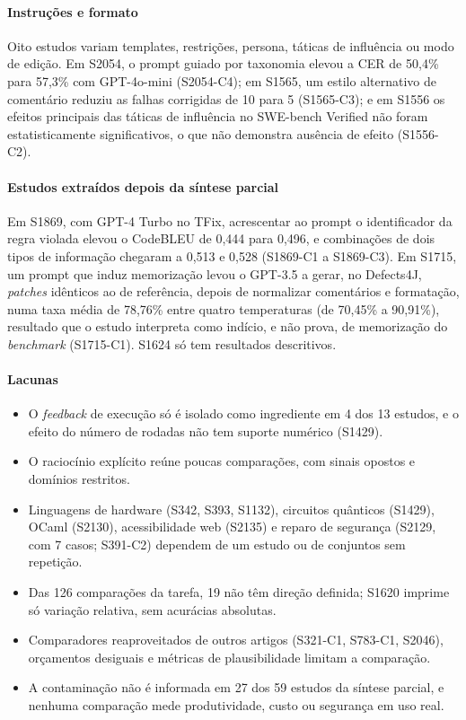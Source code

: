 \paragraph{Instruções e formato}
Oito estudos variam templates, restrições, persona, táticas de influência ou modo de edição.
Em S2054, o prompt guiado por taxonomia elevou a CER de 50,4\% para 57,3\% com GPT-4o-mini (S2054-C4); em S1565, um estilo alternativo de comentário reduziu as falhas corrigidas de 10 para 5 (S1565-C3); e em S1556 os efeitos principais das táticas de influência no SWE-bench Verified não foram estatisticamente significativos, o que não demonstra ausência de efeito (S1556-C2).

\paragraph{Estudos extraídos depois da síntese parcial}
Em S1869, com GPT-4 Turbo no TFix, acrescentar ao prompt o identificador da regra violada elevou o CodeBLEU de
0,444 para 0,496, e combinações de dois tipos de informação chegaram a 0,513 e 0,528 (S1869-C1 a S1869-C3).
Em S1715, um prompt que induz memorização levou o GPT-3.5 a gerar, no Defects4J, \textit{patches} idênticos ao de referência,
depois de normalizar comentários e formatação, numa taxa média de 78,76\% entre quatro temperaturas (de 70,45\% a
90,91\%), resultado que o estudo interpreta como indício, e não prova, de memorização do \textit{benchmark} (S1715-C1). S1624 só tem resultados descritivos.

\paragraph{Lacunas}
\begin{itemize}
  \item O \textit{feedback} de execução só é isolado como ingrediente em 4 dos 13 estudos, e o efeito do número de rodadas não tem suporte numérico (S1429).
  \item O raciocínio explícito reúne poucas comparações, com sinais opostos e domínios restritos.
  \item Linguagens de hardware (S342, S393, S1132), circuitos quânticos (S1429), OCaml (S2130), acessibilidade web (S2135) e reparo de segurança (S2129, com 7 casos; S391-C2) dependem de um estudo ou de conjuntos sem repetição.
  \item Das 126 comparações da tarefa, 19 não têm direção definida; S1620 imprime só variação relativa, sem acurácias absolutas.
  \item Comparadores reaproveitados de outros artigos (S321-C1, S783-C1, S2046), orçamentos desiguais e métricas de plausibilidade limitam a comparação.
  \item A contaminação não é informada em 27 dos 59 estudos da síntese parcial, e nenhuma comparação mede produtividade, custo ou segurança em uso real.
\end{itemize}
